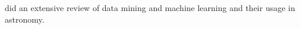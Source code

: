 


\cite{Ball10} did an extensive review of data mining and machine learning and their usage in astronomy.












